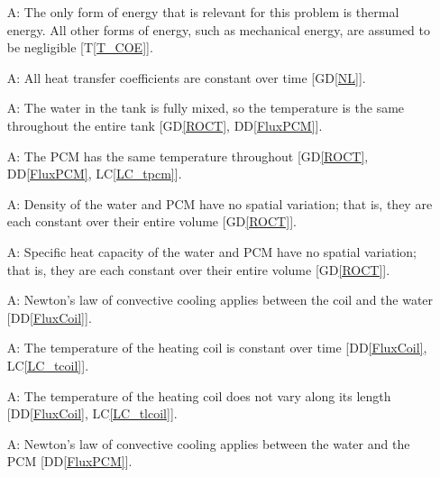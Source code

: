 \documentclass[12pt]{article}
\newcommand{\dref}[1]{GD\ref{#1}}
\newcommand{\ddref}[1]{DD\ref{#1}}
\newcommand{\tref}[1]{T\ref{#1}}
\newcounter{assumpnum} %
\newcommand{\lcref}[1]{LC\ref{#1}}
\begin{document}
\begin{itemize}

\item[A\refstepcounter{assumpnum}\theassumpnum \label{A_OnlyThermalEnergy}:] The
  only form of energy that is relevant for this problem is thermal energy.  All
  other forms of energy, such as mechanical energy, are assumed to be
  negligible [\tref{T_COE}].

\item[A\refstepcounter{assumpnum}\theassumpnum \label{A_hcoeff}:] All heat
  transfer coefficients are constant over time [\dref{NL}].

\item[A\refstepcounter{assumpnum}\theassumpnum \label{A_mixed}:] The water in
  the tank is fully mixed, so the temperature is the same throughout the entire
  tank [\dref{ROCT}, \ddref{FluxPCM}].

\item[A\refstepcounter{assumpnum}\theassumpnum \label{A_tpcm}:] The PCM has the
  same temperature throughout [\dref{ROCT}, \ddref{FluxPCM}, \lcref{LC_tpcm}].

\item[A\refstepcounter{assumpnum}\theassumpnum \label{A_const_density}:] Density
  of the water and PCM have no spatial variation; that is, they are each
  constant over their entire volume [\dref{ROCT}].

\item[A\refstepcounter{assumpnum}\theassumpnum \label{A_const_C}:] Specific heat
  capacity of the water and PCM have no spatial variation; that is, they are
  each constant over their entire volume [\dref{ROCT}].

\item[A\refstepcounter{assumpnum}\theassumpnum \label{A_Newt_coil}:] Newton's
  law of convective cooling applies between the coil and the water [\ddref{FluxCoil}].
	
\item[A\refstepcounter{assumpnum}\theassumpnum \label{A_tcoil}:] The temperature
  of the heating coil is constant over time [\ddref{FluxCoil}, \lcref{LC_tcoil}].
	
\item[A\refstepcounter{assumpnum}\theassumpnum \label{A_tlcoil}:] The
  temperature of the heating coil does not vary along its
  length [\ddref{FluxCoil}, \lcref{LC_tlcoil}].

\item[A\refstepcounter{assumpnum}\theassumpnum \label{A_Newt_pcm}:] Newton's law
  of convective cooling applies between the water and the PCM [\ddref{FluxPCM}].


\end{itemize}
\end{document}
